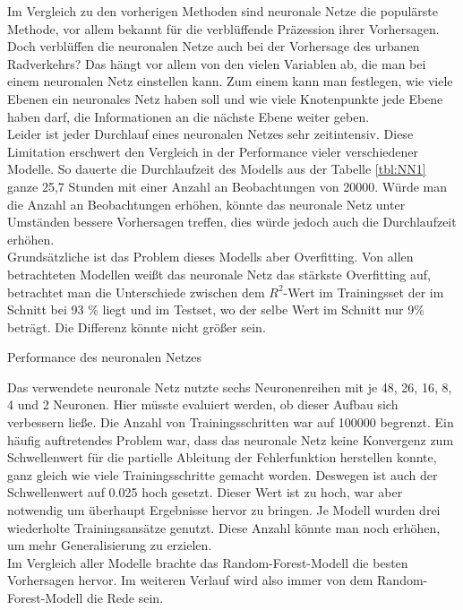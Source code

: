 \documentclass[a4paper,12pt]{thesis}
\begin{document}
Im Vergleich zu den vorherigen Methoden sind neuronale Netze die populärste Methode, vor allem bekannt für die verblüffende Präzession ihrer Vorhersagen. Doch verblüffen die neuronalen Netze auch bei der Vorhersage des urbanen Radverkehrs? Das hängt vor allem von den vielen Variablen ab, die man bei einem neuronalen Netz einstellen kann. Zum einem kann man festlegen, wie viele Ebenen ein neuronales Netz haben soll und wie viele Knotenpunkte jede Ebene haben darf, die Informationen an die nächste Ebene weiter geben.\\
Leider ist jeder Durchlauf eines neuronalen Netzes sehr zeitintensiv. Diese Limitation erschwert den Vergleich in der Performance vieler verschiedener Modelle. So dauerte die Durchlaufzeit des Modells aus der Tabelle \ref{tbl:NN1} ganze 25,7 Stunden mit einer Anzahl an Beobachtungen von 20000. Würde man die Anzahl an Beobachtungen erhöhen, könnte das neuronale Netz unter Umständen bessere Vorhersagen treffen, dies würde jedoch auch die Durchlaufzeit erhöhen.\\
Grundsätzliche ist das Problem dieses Modells aber Overfitting. Von allen betrachteten Modellen weißt das neuronale Netz das stärkste Overfitting auf, betrachtet man die Unterschiede zwischen dem $R^2$-Wert im Trainingsset der im Schnitt bei 93 \% liegt und im Testset, wo der selbe Wert im Schnitt nur 9\% beträgt. Die Differenz könnte nicht größer sein.

\begin{table}
	\caption{Performance des neuronalen Netzes}
	\label{tbl:NN1}
\end{table}

Das verwendete neuronale Netz nutzte sechs Neuronenreihen mit je 48, 26, 16, 8, 4 und 2 Neuronen. Hier müsste evaluiert werden, ob dieser Aufbau sich verbessern ließe. Die Anzahl von Trainingsschritten war auf 100000 begrenzt. Ein häufig auftretendes Problem war, dass das neuronale Netz keine Konvergenz zum Schwellenwert für die partielle Ableitung der Fehlerfunktion herstellen konnte, ganz gleich wie viele Trainingsschritte gemacht worden. Deswegen ist auch der Schwellenwert auf 0.025 hoch gesetzt. Dieser Wert ist zu hoch, war aber notwendig um überhaupt Ergebnisse hervor zu bringen. Je Modell wurden drei wiederholte Trainingsansätze genutzt. Diese Anzahl könnte man noch erhöhen, um mehr Generalisierung zu erzielen.\\
Im Vergleich aller Modelle brachte das Random-Forest-Modell die besten Vorhersagen hervor. Im weiteren Verlauf wird also immer von dem Random-Forest-Modell die Rede sein.
\end{document}
